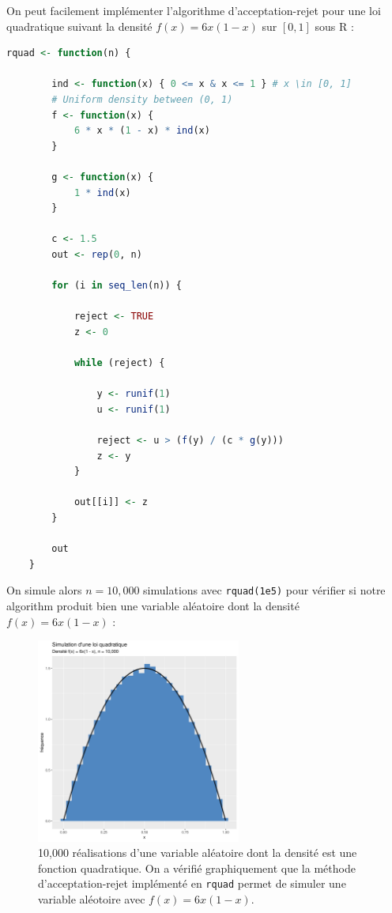 \documentclass[10pt]{article} %
\begin{document}
On peut facilement implémenter l'algorithme d'acceptation-rejet pour une loi quadratique suivant la densité $f(x) = 6x(1 - x)$ sur $[0, 1]$ sous R :
\begin{lstlisting}[language=R]
    rquad <- function(n) {

        ind <- function(x) { 0 <= x & x <= 1 } # x \in [0, 1]
        # Uniform density between (0, 1)
        f <- function(x) {
            6 * x * (1 - x) * ind(x)
        }

        g <- function(x) {
            1 * ind(x)
        }

        c <- 1.5
        out <- rep(0, n)

        for (i in seq_len(n)) {

            reject <- TRUE
            z <- 0

            while (reject) {

                y <- runif(1)
                u <- runif(1)

                reject <- u > (f(y) / (c * g(y)))
                z <- y
            }

            out[[i]] <- z
        }

        out
    }
\end{lstlisting}

On simule alors $n = 10,000$ simulations avec \texttt{rquad(1e5)} pour vérifier si notre algorithm produit bien une variable aléatoire dont la densité
$f(x) = 6x(1 - x)$ :

\begin{figure}[h!]
    \centering
    \includegraphics[width=0.6\textwidth]{media/rquad_sim.png}
    \caption{10,000 réalisations d'une variable aléatoire dont la densité est une fonction quadratique. On a vérifié graphiquement que la méthode d'acceptation-rejet implémenté en \texttt{rquad}
    permet de simuler une variable aléotoire avec $f(x) = 6x(1 - x)$.}
\end{figure}
\end{document}
